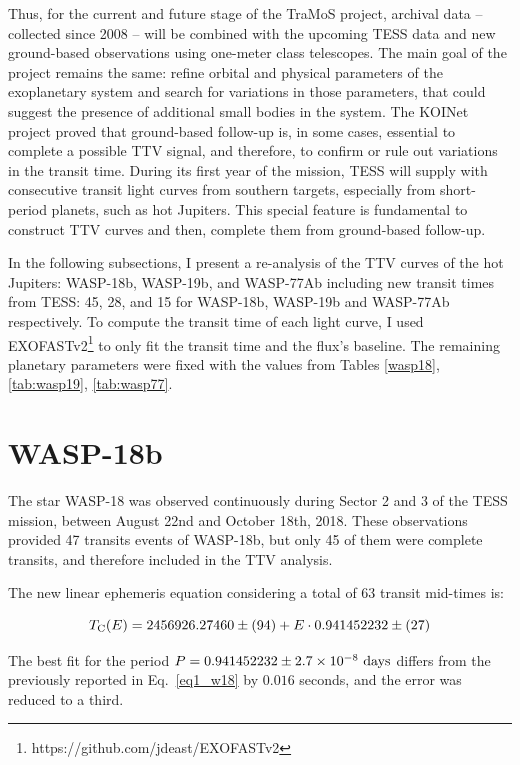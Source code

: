 
Thus, for the current and future stage of the TraMoS project, archival data -- collected since 2008 -- will be combined with the upcoming TESS data and new ground-based observations using one-meter class telescopes. The main goal of the project remains the same: refine orbital and physical parameters of the exoplanetary system and search for variations in those parameters, that could suggest the presence of additional small bodies in the system. The KOINet project proved that ground-based follow-up is, in some cases, essential to complete a possible TTV signal, and therefore, to confirm or rule out variations in the transit time. During its first year of the mission, TESS will supply with consecutive transit light curves from southern targets, especially from short-period planets, such as hot Jupiters. This special feature is fundamental to construct TTV curves and then, complete them from ground-based follow-up.

In the following subsections, I present a re-analysis of the TTV curves of the hot Jupiters: WASP-18b, WASP-19b, and WASP-77Ab including new transit times from TESS: 45, 28, and 15 for WASP-18b, WASP-19b and WASP-77Ab respectively. To compute the transit time of each light curve, I used EXOFASTv2\footnote{https://github.com/jdeast/EXOFASTv2} \citep{Eastman2013} to only fit the transit time and the flux's baseline. The remaining planetary parameters were fixed with the values from Tables \ref{wasp18}, \ref{tab:wasp19}, \ref{tab:wasp77}.

\section{WASP-18b}

The star WASP-18 was observed continuously during Sector 2 and 3 of the TESS mission, between August 22nd and October 18th, 2018. These observations provided 47 transits events of WASP-18b, but only 45 of them were complete transits, and therefore included in the TTV analysis. 

The new linear ephemeris equation considering a total of 63 transit mid-times is:

\begin{equation}
T_{\rm C}(E)=2456926.27460\pm(94)+E \cdot 0.941452232 \pm(27)
\end{equation}

The best fit for the period $P= 0.941452232 \pm 2.7\times10^{-8} ~\rm days$ differs from the previously reported in Eq.~\ref{eq1_w18} by $0.016$ seconds, and the error was reduced to a third.

